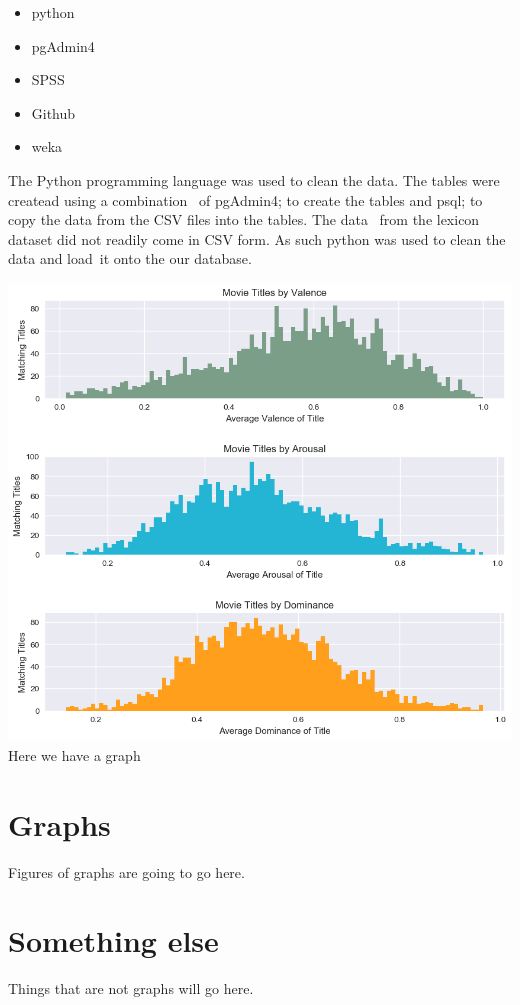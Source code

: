 \documentclass[12pt,a4paper]{article}
\begin{document}
    \begin{itemize}
        \item python
        \item pgAdmin4
        \item SPSS
        \item Github
        \item weka
    \end{itemize}
    The Python programming language was used to clean the data. The tables were createad using a combination \
    of pgAdmin4; to create the tables and psql; to copy the data from the CSV files into the tables. The data \
    from the lexicon dataset did not readily come in CSV form.  As such python was used to clean the data and load\
    it onto the our database.

    \centering
    \includegraphics[scale=0.8]{Movie_titles_by_vad}
    Here we have a graph

    \begin{appendices}
        \section{Graphs}
        Figures of graphs are going to go here.
        \section{Something else}
        Things that are not graphs will go here.
    \end{appendices}
\end{document}
